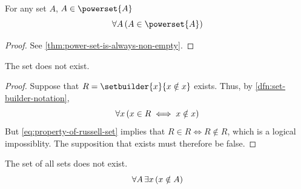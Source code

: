 \begin{thm}
    \label{thm:every-set-is-an-element-of-its-powerset}
    For any set \( A \), \( A \in \powerset{A} \)
    \begin{equation*}
        \forall A \, \mleft( A \in \powerset{A} \mright)
    \end{equation*}
\end{thm}

\begin{proof}
    See \cref{thm:power-set-is-always-non-empty}.
\end{proof}

\begin{thm}
    \label{thm:russell-paradox}
    The set  does not exist.
\end{thm}

\begin{proof}
    Suppose that \( R = \setbuilder{x}{x \notin x} \) exists. Thus,
    by \cref{dfn:set-builder-notation},
    \begin{equation}
        \label{eq:property-of-russell-set}
        \forall x \, \mleft( x \in R \iff x \notin x \mright)
    \end{equation}
    But \eqref{eq:property-of-russell-set} implies that
    \( R \in R \iff R \notin R \), which is a logical
    impossiblity. The supposition that 
    exists must therefore be false.
\end{proof}

\begin{thm}
    \label{thm:the-set-of-all-sets-does-not-exist}
    The set of all sets does not exist.
    \begin{equation*}
        \forall A \, \exists x \, \mleft( x \notin A \mright)
    \end{equation*}
\end{thm}

